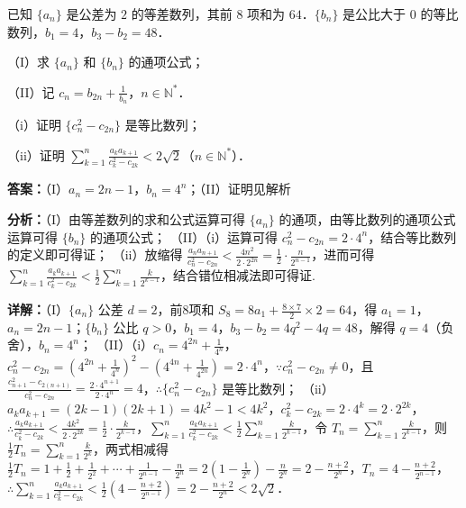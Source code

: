 \begin{question}[points=15]
已知 $\{a_n\}$ 是公差为 $2$ 的等差数列，其前 $8$ 项和为 $64$．$\{b_n\}$ 是公比大于 $0$ 的等比数列，$b_1 = 4$，$b_3 - b_2 = 48$．

（I）求 $\{a_n\}$ 和 $\{b_n\}$ 的通项公式；

（II）记 $c_n = b_{2n} + \frac{1}{b_n}$，$n \in \mathbb{N}^*$．

（i）证明 $\{c_n^2 - c_{2n}\}$ 是等比数列；

（ii）证明 $\sum_{k=1}^n \frac{a_k a_{k+1}}{c_k^2 - c_{2k}} < 2\sqrt{2}$（$n \in \mathbb{N}^*$）．
\begin{solution}
\textbf{答案：}（I）$a_n = 2n-1$，$b_n = 4^n$；（II）证明见解析

\textbf{分析：}（I）由等差数列的求和公式运算可得 $\{a_n\}$ 的通项，由等比数列的通项公式运算可得 $\{b_n\}$ 的通项公式；
（II）（i）运算可得 $c_n^2 - c_{2n} = 2 \cdot 4^n$，结合等比数列的定义即可得证；
（ii）放缩得 $\frac{a_n a_{n+1}}{c_n^2 - c_{2n}} < \frac{4n^2}{2 \cdot 2^{2n}} = \frac{1}{2} \cdot \frac{n}{2^{n-1}}$，进而可得 $\sum_{k=1}^n \frac{a_k a_{k+1}}{c_k^2 - c_{2k}} < \frac{1}{2} \sum_{k=1}^n \frac{k}{2^{k-1}}$，结合错位相减法即可得证.

\textbf{详解：}（I）$\{a_n\}$ 公差 $d=2$，前8项和 $S_8 = 8a_1 + \frac{8\times7}{2}\times2 = 64$，得 $a_1=1$，$a_n = 2n-1$；$\{b_n\}$ 公比 $q>0$，$b_1=4$，$b_3-b_2=4q^2-4q=48$，解得 $q=4$（负舍），$b_n=4^n$；
（II）（i）$c_n = 4^{2n} + \frac{1}{4^n}$，$c_n^2 - c_{2n} = \left(4^{2n} + \frac{1}{4^n}\right)^2 - \left(4^{4n} + \frac{1}{4^{2n}}\right) = 2\cdot4^n$，$\because c_n^2 - c_{2n} \neq 0$，且 $\frac{c_{n+1}^2 - c_{2(n+1)}}{c_n^2 - c_{2n}} = \frac{2\cdot4^{n+1}}{2\cdot4^n} = 4$，$\therefore \{c_n^2 - c_{2n}\}$ 是等比数列；
（ii）$a_k a_{k+1} = (2k-1)(2k+1) = 4k^2-1 < 4k^2$，$c_k^2 - c_{2k} = 2\cdot4^k = 2\cdot2^{2k}$，$\therefore \frac{a_k a_{k+1}}{c_k^2 - c_{2k}} < \frac{4k^2}{2\cdot2^{2k}} = \frac{1}{2}\cdot\frac{k}{2^{k-1}}$，$\sum_{k=1}^n \frac{a_k a_{k+1}}{c_k^2 - c_{2k}} < \frac{1}{2} \sum_{k=1}^n \frac{k}{2^{k-1}}$，令 $T_n = \sum_{k=1}^n \frac{k}{2^{k-1}}$，则 $\frac{1}{2}T_n = \sum_{k=1}^n \frac{k}{2^k}$，两式相减得 $\frac{1}{2}T_n = 1+\frac{1}{2}+\frac{1}{2^2}+\cdots+\frac{1}{2^{n-1}} - \frac{n}{2^n} = 2\left(1-\frac{1}{2^n}\right) - \frac{n}{2^n} = 2 - \frac{n+2}{2^n}$，$T_n = 4 - \frac{n+2}{2^{n-1}}$，$\therefore \sum_{k=1}^n \frac{a_k a_{k+1}}{c_k^2 - c_{2k}} < \frac{1}{2}\left(4 - \frac{n+2}{2^{n-1}}\right) = 2 - \frac{n+2}{2^n} < 2\sqrt{2}$．
\end{solution}
\end{question}

